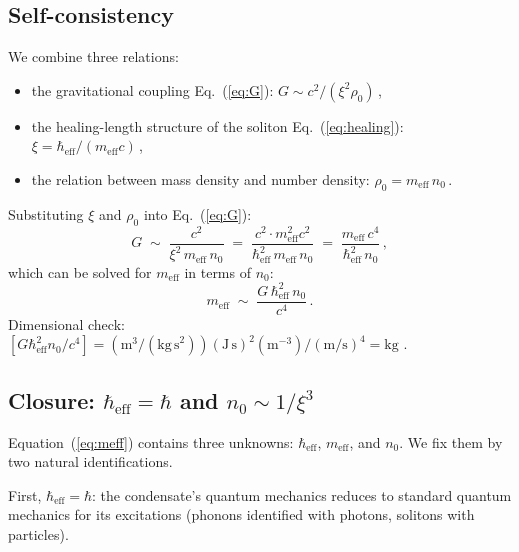 \documentclass[12pt, a4paper]{article}
\newcommand{\meff}{m_{\mathrm{eff}}}
\newcommand{\heff}{\hbar_{\mathrm{eff}}}
\begin{document}
\subsection{Self-consistency}
\label{sec:self_consistency}

We combine three relations:
\begin{itemize}
\item the gravitational coupling
  Eq.~(\ref{eq:G}): $G \sim c^2/(\xi^2 \rho_0)$\,,
\item the healing-length structure of the soliton
  Eq.~(\ref{eq:healing}): $\xi = \heff/(\meff c)$\,,
\item the relation between mass density and number
  density: $\rho_0 = \meff\,n_0$\,.
\end{itemize}
Substituting $\xi$ and $\rho_0$ into Eq.~(\ref{eq:G}):
\begin{equation}
    G \;\sim\;
    \frac{c^2}{\xi^2\,\meff\,n_0}
    \;=\;\frac{c^2 \cdot \meff^2 c^2}{\heff^2\,\meff\,n_0}
    \;=\;\frac{\meff\,c^4}{\heff^2\,n_0}\,,
\label{eq:G_chain}
\end{equation}
which can be solved for $\meff$ in terms of $n_0$:
\begin{equation}
    \meff \;\sim\; \frac{G\,\heff^2\,n_0}{c^4}\,.
\label{eq:meff}
\end{equation}
Dimensional check: $[G\heff^2 n_0/c^4] =
(\mathrm{m}^3/(\mathrm{kg\,s}^2))(\mathrm{J\,s})^2(\mathrm{m}^{-3})/(\mathrm{m/s})^4
= \mathrm{kg}$ \checkmark.

\subsection{Closure: \texorpdfstring{$\heff = \hbar$ and $n_0 \sim 1/\xi^3$}{heff = hbar and n0 ~ 1/xi cubed}}

Equation~(\ref{eq:meff}) contains three unknowns:
$\heff$, $\meff$, and $n_0$. We fix them by two
natural identifications.

First, $\heff = \hbar$: the condensate's quantum
mechanics reduces to standard quantum mechanics for
its excitations (phonons identified with photons,
solitons with particles).
\end{document}
